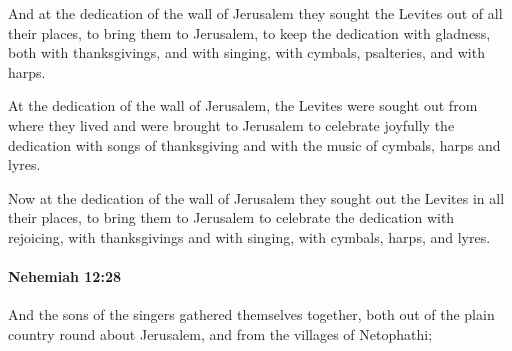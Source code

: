 			\begin{versebox}
					\item[BHS] 
					\item[LXX] 
					\item[ASV] And at the dedication of the wall of Jerusalem they sought the Levites out of all their places, to bring them to Jerusalem, to keep the dedication with gladness, both with thanksgivings, and with singing, with cymbals, psalteries, and with harps.
					\item[NIV] At the dedication of the wall of Jerusalem, the Levites were sought out from where they lived and were brought to Jerusalem to celebrate joyfully the dedication with songs of thanksgiving and with the music of cymbals, harps and lyres.
					\item[NRSV] Now at the dedication of the wall of Jerusalem they sought out the Levites in all their places, to bring them to Jerusalem to celebrate the dedication with rejoicing, with thanksgivings and with singing, with cymbals, harps, and lyres.
			\end{versebox}

		\paragraph{Nehemiah 12:28} %
			\label{NEHEMIAH-12-28}

			And the sons of the singers gathered themselves together, both out of the plain country round about Jerusalem, and from the villages of Netophathi;

